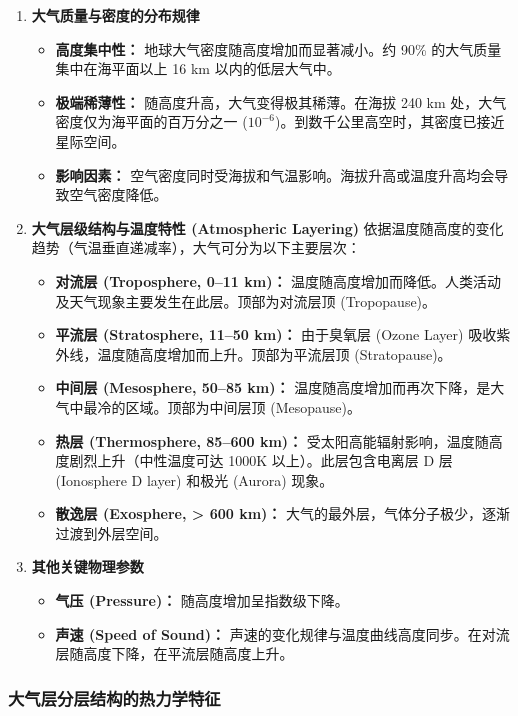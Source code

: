 \documentclass[12pt,a4paper]{article}
\begin{document}
	\begin{enumerate}
		\item \textbf{大气质量与密度的分布规律}
		\begin{itemize}
			\item \textbf{高度集中性：} 地球大气密度随高度增加而显著减小。约 90\% 的大气质量集中在海平面以上 16 km 以内的低层大气中。
			\item \textbf{极端稀薄性：} 随高度升高，大气变得极其稀薄。在海拔 240 km 处，大气密度仅为海平面的百万分之一 ($10^{-6}$)。到数千公里高空时，其密度已接近星际空间。
			\item \textbf{影响因素：} 空气密度同时受海拔和气温影响。海拔升高或温度升高均会导致空气密度降低。
		\end{itemize}
		
		\item \textbf{大气层级结构与温度特性 (Atmospheric Layering)}
		依据温度随高度的变化趋势（气温垂直递减率），大气可分为以下主要层次：
		\begin{itemize}
			\item \textbf{对流层 (Troposphere, 0--11 km)：} 温度随高度增加而降低。人类活动及天气现象主要发生在此层。顶部为对流层顶 (Tropopause)。
			\item \textbf{平流层 (Stratosphere, 11--50 km)：} 由于臭氧层 (Ozone Layer) 吸收紫外线，温度随高度增加而上升。顶部为平流层顶 (Stratopause)。
			\item \textbf{中间层 (Mesosphere, 50--85 km)：} 温度随高度增加而再次下降，是大气中最冷的区域。顶部为中间层顶 (Mesopause)。
			\item \textbf{热层 (Thermosphere, 85--600 km)：} 受太阳高能辐射影响，温度随高度剧烈上升（中性温度可达 1000K 以上）。此层包含电离层 D 层 (Ionosphere D layer) 和极光 (Aurora) 现象。
			\item \textbf{散逸层 (Exosphere, > 600 km)：} 大气的最外层，气体分子极少，逐渐过渡到外层空间。
		\end{itemize}
		
		\item \textbf{其他关键物理参数}
		\begin{itemize}
			\item \textbf{气压 (Pressure)：} 随高度增加呈指数级下降。
			\item \textbf{声速 (Speed of Sound)：} 声速的变化规律与温度曲线高度同步。在对流层随高度下降，在平流层随高度上升。
		\end{itemize}
	\end{enumerate}
	
	\subsubsection{大气层分层结构的热力学特征}
	
\end{document}
